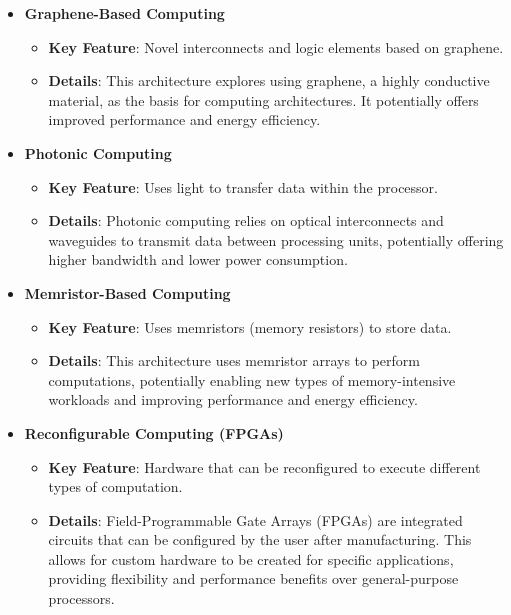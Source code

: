 \documentclass{article}
\begin{document}
\begin{itemize}
    \item \textbf{Graphene-Based Computing}
    \begin{itemize}
        \item{\textbf{Key Feature}}: Novel interconnects and logic elements based on graphene.
        \item{\textbf{Details}}: This architecture explores using graphene, a highly conductive material, as the basis for computing architectures. It potentially offers improved performance and energy efficiency.
    \end{itemize}

    \item \textbf{Photonic Computing}
    \begin{itemize}
        \item{\textbf{Key Feature}}: Uses light to transfer data within the processor.
        \item{\textbf{Details}}: Photonic computing relies on optical interconnects and waveguides to transmit data 
between processing units, potentially offering higher bandwidth and lower power consumption.
    \end{itemize}

    \item \textbf{Memristor-Based Computing}
    \begin{itemize}
        \item{\textbf{Key Feature}}: Uses memristors (memory resistors) to store data.
        \item{\textbf{Details}}: This architecture uses memristor arrays to perform computations, potentially enabling 
new types of memory-intensive workloads and improving performance and energy efficiency.
    \end{itemize}

    \item{\textbf{Reconfigurable Computing (FPGAs)}}
    \begin{itemize}
        \item{\textbf{Key Feature}}: Hardware that can be reconfigured to execute different types of computation.
        \item{\textbf{Details}}: Field-Programmable Gate Arrays (FPGAs) are integrated circuits that can be configured by the user after manufacturing. This allows for custom hardware to be created for specific applications, providing flexibility and performance benefits over general-purpose processors.
    \end{itemize}


\end{itemize}
\end{document}
